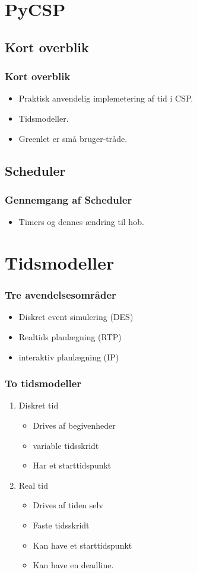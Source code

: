 \documentclass[12pt]{beamer}
\begin{document}
\section{PyCSP}
\subsection{Kort overblik}
\begin{frame}		
  \frametitle{Kort overblik}
  \begin{itemize}
	\item Praktisk anvendelig implemetering af tid i CSP.
	\item Tidsmodeller.
	\item Greenlet er små bruger-tråde.
  \end{itemize}
\end{frame}

\subsection{Scheduler}
\begin{frame}
  \frametitle{Gennemgang af Scheduler}
  \begin{itemize}
	\item Timers og dennes ændring til hob.
  \end{itemize}
\end{frame}


\section{Tidsmodeller}
\begin{frame}
	\frametitle{Tre avendelsesområder}
	\begin{itemize}
		\item Diskret event simulering (DES)
		\item Realtids planlægning (RTP)
		\item interaktiv planlægning (IP)
	\end{itemize}
\end{frame}

\begin{frame}
	\frametitle{To tidsmodeller}
	\begin{enumerate}
		\item Diskret tid
		\begin{itemize}
			\item Drives af begivenheder
			\item variable tidsskridt
			\item Har et starttidspunkt
 		\end{itemize}
		\item Real tid
		\begin{itemize}
			\item Drives af tiden selv
			\item Faste tidsskridt
			\item Kan have et starttidspunkt
			\item Kan have en deadline.
		\end{itemize}
	\end{enumerate}
\end{frame}
\end{document}
